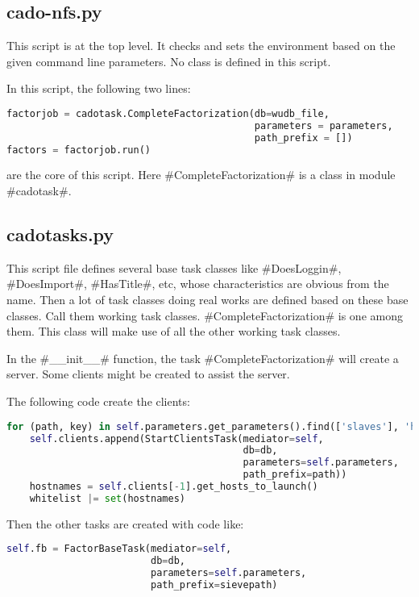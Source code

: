 \documentclass[a4paper]{article}
\begin{document}
\subsection{cado-nfs.py}

This script is at the top level.
It checks and sets the environment based on the given command line parameters.
No class is defined in this script.

In this script, the following two lines:
\begin{lstlisting}[language=python]
factorjob = cadotask.CompleteFactorization(db=wudb_file,
                                           parameters = parameters,
                                           path_prefix = [])
factors = factorjob.run()
\end{lstlisting}
are the core of this script.
Here #CompleteFactorization# is a class in module #cadotask#.

\subsection{cadotasks.py}

This script file defines several base task classes like #DoesLoggin#,
#DoesImport#, #HasTitle#, etc, whose characteristics are obvious from the name.
Then a lot of task classes doing real works are defined based on these base classes.
Call them working task classes.
#CompleteFactorization# is one among them.
This class will make use of all the other working task classes.

In the #__init__# function, the task #CompleteFactorization# will create a server.
Some clients might be created to assist the server.

The following code create the clients:

\begin{lstlisting}[language=python]
for (path, key) in self.parameters.get_parameters().find(['slaves'], 'hostnames'):
    self.clients.append(StartClientsTask(mediator=self,
                                         db=db,
                                         parameters=self.parameters,
                                         path_prefix=path))
    hostnames = self.clients[-1].get_hosts_to_launch()
    whitelist |= set(hostnames)
\end{lstlisting}

Then the other tasks are created with code like:
\begin{lstlisting}[language=python]
self.fb = FactorBaseTask(mediator=self,
                         db=db,
                         parameters=self.parameters,
                         path_prefix=sievepath)
\end{lstlisting}
\end{document}
